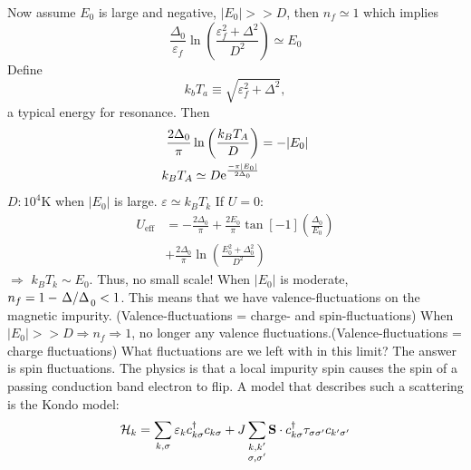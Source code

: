Now assume $E_0$ is large and negative, $|E_0|>>D$, then $n_f \simeq 1$ which implies
\begin{equation*}
	\frac{\Delta_0}{\varepsilon_f}\ln\left(\frac{\varepsilon_f^2 + \Delta^2}{D^2}\right) \simeq E_0
\end{equation*}
Define 
\begin{equation}
	k_bT_a \equiv \sqrt{\varepsilon_f^2 + \Delta^2},
\end{equation}
a typical energy for resonance. Then
\begin{align*}
\frac{2\Delta_0}{\pi}\ln\left(\frac{k_BT_A}{D}\right) &= -|E_0| \\
k_BT_A\simeq D\mathrm{e}^{\frac{-\pi|E_0|}{2\Delta_0}}
\end{align*}
$D: 10^4\mathrm{K}$ when $|E_0|$ is large. $\varepsilon\simeq k_BT_k$
If $U=0$: 
\begin{align}
	U_\text{eff} &= -\frac{2\Delta_0}{\pi} + \frac{2E_0}{\pi}\tan[-1](\frac{\Delta_0}{E_0}) \\
	&+\frac{2\Delta_0}{\pi}\ln\left(\frac{E_0^2 + \Delta_0^2}{D^2}\right)
\end{align}
$\Rightarrow$ $k_BT_k \sim E_0$. Thus, no small scale! When $|E_0|$ is moderate, $n_f = 1-\flatfrac{\Delta}\Delta_0<1$. This means that we have valence-fluctuations on the magnetic impurity. (Valence-fluctuations = charge- and spin-fluctuations) When $|E_0| >> D \Rightarrow n_f\Rightarrow1$, no longer any valence fluctuations.(Valence-fluctuations = charge fluctuations) What fluctuations are we left with in this limit? The answer is spin fluctuations. The physics is that a local impurity spin causes the spin of a passing conduction band electron to flip. A model that describes such a scattering is the Kondo model:
\begin{equation}
\mathcal{H}_k  = \sum_{k,\sigma}\varepsilon_kc_{k\sigma}^\dagger c_{k\sigma} + J\sum_{\substack{k,k' \\ \sigma,\sigma'}}\vb{S}\cdot c_{k\sigma}^\dagger \tau_{\sigma\sigma'}c_{k'\sigma'}
\end{equation}
